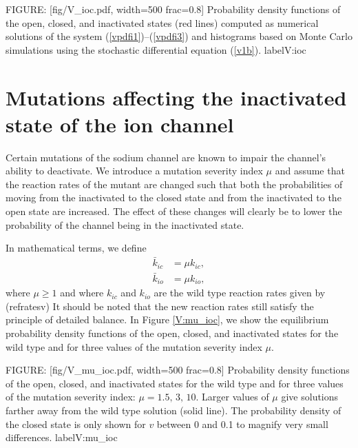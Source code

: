 FIGURE: [fig/V_ioc.pdf, width=500 frac=0.8] Probability density functions of the open, closed, and inactivated states
(red lines) computed as numerical solutions of the system (\ref{vpdfi1})--(\ref{vpdfi3}) and
histograms based on Monte Carlo simulations using the stochastic differential
equation (\ref{v1b}). 
 label{V:ioc}
\section[Mutations affecting inactivation]{Mutations affecting the inactivated state of the ion channel}
\label{mutaffectinactiv}

Certain mutations of the sodium channel are known to impair the
channel's ability to deactivate. We introduce a mutation severity index $\mu$
and assume that the reaction rates of the mutant are changed such that both
the probabilities of moving from the inactivated to the closed state and from the 
inactivated to the open state are increased. The effect of these changes will clearly be to lower 
the probability of the channel being in the inactivated state.

In mathematical terms, we define
\begin{align}
\bar{k}_{ic} &  =\mu k_{ic},\label{ratesvm}\\
\bar{k}_{io} &  =\mu k_{io}, \nonumber
\end{align}
where $\mu\geqslant1$ and where $k_{ic}$ and $k_{io}$ are the wild type
reaction rates given by (ref{ratesv}) It should be noted that the
new reaction rates still satisfy the principle of detailed balance. 
In Figure \ref{V:mu_ioc}, we show the equilibrium
probability density functions of the open, closed, and inactivated states for 
the wild type and for three values of the mutation severity index $\mu.$

FIGURE: [fig/V_mu_ioc.pdf, width=500 frac=0.8] Probability density functions of the open, closed, and 
inactivated states for the wild type and for three values of the mutation 
severity index: $\mu=1.5,\, 3,\, 10.$ Larger values of $\mu$ give
solutions farther away from the wild type solution (solid line). The probability density of the closed state is 
only shown for $v$ between 0 and 0.1 to magnify very small differences. label{V:mu_ioc}

